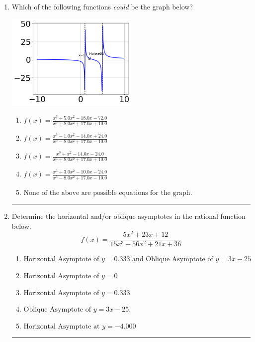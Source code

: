 \documentclass[14pt]{extbook}
\newcommand{\litem}[1]{\item#1\hspace*{-1cm}\rule{\textwidth}{0.4pt}}
\begin{document}
\begin{enumerate}
{\begin{enumerate}[label=\Alph*.]
\end{enumerate} }
\litem{
Which of the following functions \textit{could} be the graph below?
\begin{center}
    \includegraphics[width=0.5\textwidth]{../Figures/identifyGraphOfRationalFunctionCopyB.png}
\end{center}
\begin{enumerate}[label=\Alph*.]
\item \( f(x)=\frac{x^{3} +5.0 x^{2} -18.0 x -72.0}{x^{3} +8.0 x^{2} +17.0 x + 10.0} \)
\item \( f(x)=\frac{x^{3} -1.0 x^{2} -14.0 x + 24.0}{x^{3} -8.0 x^{2} +17.0 x -10.0} \)
\item \( f(x)=\frac{x^{3} + x^{2} -14.0 x -24.0}{x^{3} +8.0 x^{2} +17.0 x + 10.0} \)
\item \( f(x)=\frac{x^{3} +3.0 x^{2} -10.0 x -24.0}{x^{3} -8.0 x^{2} +17.0 x -10.0} \)
\item \( \text{None of the above are possible equations for the graph.} \)

\end{enumerate} }
\litem{
Determine the horizontal and/or oblique asymptotes in the rational function below.\[ f(x) = \frac{5x^{2} +23 x + 12}{15x^{3} -56 x^{2} +21 x + 36} \]\begin{enumerate}[label=\Alph*.]
\item \( \text{Horizontal Asymptote of } y = 0.333 \text{ and Oblique Asymptote of } y = 3x -25 \)
\item \( \text{Horizontal Asymptote of } y = 0 \)
\item \( \text{Horizontal Asymptote of } y = 0.333  \)
\item \( \text{Oblique Asymptote of } y = 3x -25. \)
\item \( \text{Horizontal Asymptote at } y = -4.000 \)


\end{enumerate}}
\end{enumerate}
\end{document}
